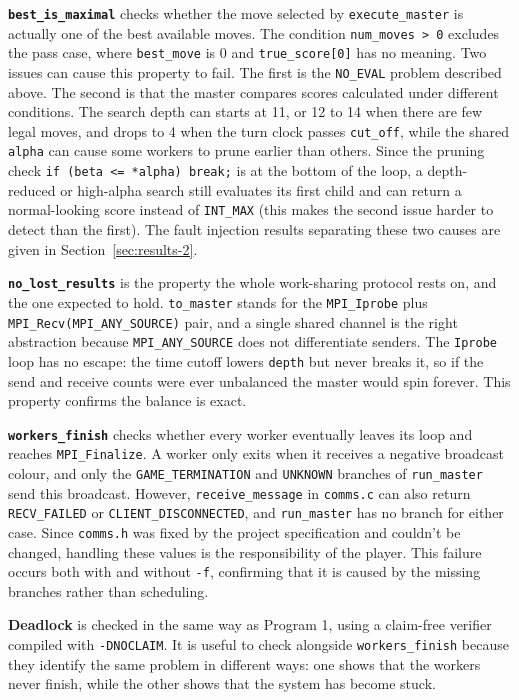 \documentclass[10pt,a4paper]{article}
\newcommand{\code}[1]{\texttt{#1}}
\begin{document}
\medskip\noindent
\textbf{\code{best\_is\_maximal}} checks whether the move selected by 
\code{execute\_master} is actually one of the best available moves. 
The condition \code{num\_moves > 0} excludes the pass case, where 
\code{best\_move} is 0 and \code{true\_score[0]} has no meaning. Two 
issues can cause this property to fail. The first is the \code{NO\_EVAL} 
problem described above. The second is that the master compares scores 
calculated under different conditions. The search depth can starts at 11, or 12 to 14 when there are few legal moves, and drops to 4 when the turn clock passes \code{cut\_off}, while the shared 
\code{alpha} can cause some workers to prune earlier than others. Since the 
pruning check \code{if (beta <= *alpha) break;} is at the bottom of the loop, 
a depth-reduced or high-alpha search still evaluates its first child and can 
return a normal-looking score instead of \code{INT\_MAX} (this makes the 
second issue harder to detect than the first). The fault injection results 
separating these two causes are given in Section~\ref{sec:results-2}.

\medskip\noindent
\textbf{\code{no\_lost\_results}} is the property the whole work-sharing
protocol rests on, and the one expected to hold. \code{to\_master} stands
for the \code{MPI\_Iprobe} plus \code{MPI\_Recv(MPI\_ANY\_SOURCE)} pair, and
a single shared channel is the right abstraction because
\code{MPI\_ANY\_SOURCE} does not differentiate senders. The
\code{Iprobe} loop has no escape: the time cutoff lowers \code{depth} but
never breaks it, so if the send and receive counts were ever unbalanced the
master would spin forever. This property confirms the balance is exact.

\medskip\noindent
\textbf{\code{workers\_finish}} checks whether every worker eventually leaves 
its loop and reaches \code{MPI\_Finalize}. A worker only exits when it 
receives a negative broadcast colour, and only the \code{GAME\_TERMINATION} 
and \code{UNKNOWN} branches of \code{run\_master} send this broadcast. 
However, \code{receive\_message} in \code{comms.c} can also return 
\code{RECV\_FAILED} or \code{CLIENT\_DISCONNECTED}, and \code{run\_master} 
has no branch for either case. Since \code{comms.h} was fixed by the project 
specification and couldn't be changed, handling these values is the 
responsibility of the player. This failure occurs both with and without 
\code{-f}, confirming that it is caused by the missing branches rather than 
scheduling.

\medskip\noindent
\textbf{Deadlock} is checked in the same way as Program 1, using a claim-free
verifier compiled with \code{-DNOCLAIM}. It is useful to check alongside
\code{workers\_finish} because they identify the same problem in different
ways: one shows that the workers never finish, while the other shows that the
system has become stuck.
\end{document}
